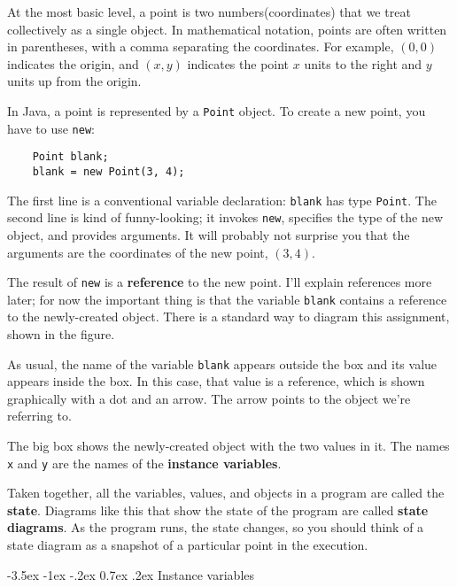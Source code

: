 \documentclass{book}
\makeatletter
\renewcommand{\section}{\@startsection 
    {section} {1} {0mm}%
    {-3.5ex \@plus -1ex \@minus -.2ex}%
    {0.7ex \@plus.2ex}%
    {\normalfont\Large\bfseries}}
\newcommand{\beforefig}{\vspace{1.3\parskip}}
\newcommand{\afterfig}{\vspace{-0.2\parskip}}
\newcommand{\myfig}[1]{
    \beforefig
    \centerline{\epsfig{#1,scale=0.8}}
    \afterfig
}
\makeatother
\begin{document}
At the most basic level, a point is two numbers(coordinates)
that we treat collectively as a single object.  In mathematical
notation, points are often written in parentheses, with a comma
separating the coordinates.  For example, $(0, 0)$ indicates
the origin, and $(x, y)$ indicates the point $x$ units to the
right and $y$ units up from the origin.


In Java, a point is represented by a {\tt Point} object.  To
create a new point, you have to use {\tt new}:

\begin{verbatim}
    Point blank;
    blank = new Point(3, 4);
\end{verbatim}
%
The first line is a conventional variable declaration: {\tt blank} has
type {\tt Point}.  The second line is kind of funny-looking; it
invokes {\tt new}, specifies the type of the new object,
and provides arguments.  It will probably not surprise you that the
arguments are the coordinates of the new point, $(3, 4)$.


The result of {\tt new} is a {\bf reference} to the new
point.  I'll explain references more later; for now the important
thing is that the variable {\tt blank} contains a reference to the
newly-created object.  There is a standard way to diagram this
assignment, shown in the figure.


\myfig{figure=figs/reference.eps}


As usual, the name of the variable {\tt blank} appears outside the box
and its value appears inside the box.  In this case, that value is a
reference, which is shown graphically with a dot and an arrow.  The
arrow points to the object we're referring to.

The big box shows the newly-created object with the two values
in it.  The names {\tt x} and {\tt y} are the names of the {\bf
instance variables}.

Taken together, all the variables, values, and objects in a
program are called the {\bf state}.  Diagrams like this that
show the state of the program are called {\bf state diagrams}.
As the program runs, the state changes, so you should think
of a state diagram as a snapshot of a particular point in the
execution.

\section{Instance variables}
\end{document}
